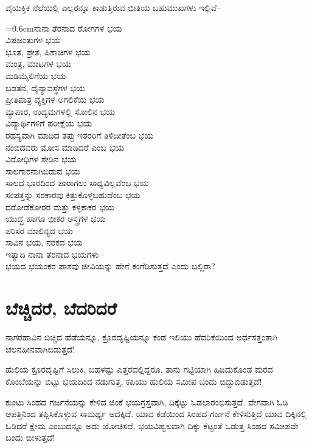 ವೈಯಕ್ತಿಕ ನೆಲೆಯಲ್ಲಿ ಎಲ್ಲರನ್ನೂ ಕಾಡುತ್ತಿರುವ ಭೀತಿಯ ಬಹುಮುಖಗಳು ಇಲ್ಲಿವೆ–

{\noindent\leftskip=0.6cmನಾನಾ ತೆರನಾದ ರೋಗಗಳ ಭಯ\\
 ವಿಷಜಂತುಗಳ ಭಯ\\
 ಭೂತ, ಪ್ರೇತ, ಪಿಶಾಚಿಗಳ ಭಯ\\
 ಮಂತ್ರ, ಮಾಟಗಳ ಭಯ\\
 ಮಡಿಮೈಲಿಗೆಯ ಭಯ\\
 ಬಡತನ, ದೈನ್ಯಾವಸ್ಥೆಗಳ ಭಯ\\
 ಪ್ರೀತಿಪಾತ್ರ ವ್ಯಕ್ತಿಗಳ ಅಗಲಿಕೆಯ ಭಯ\\
 ವ್ಯಾಪಾರ, ಉದ್ಯಮಗಳಲ್ಲಿ ಸೋಲಿನ ಭಯ\\
 ವಿದ್ಯಾರ್ಥಿಗಳಿಗೆ ಪರೀಕ್ಷೆಯ ಭಯ\\
 ರಹಸ್ಯವಾಗಿ ಮಾಡಿದ ತಪ್ಪು ಇತರರಿಗೆ ತಿಳಿದೀತೆಂಬ ಭಯ\\
 ನಂಬಿದವರು ಮೋಸ ಮಾಡಿದರೆ ಎಂಬ ಭಯ\\
 ವಿರೋಧಿಗಳ ಸೇಡಿನ ಭಯ\\
 ಸಾಲಗಾರನಾಗಿಬಿಡುವ ಭಯ\\
 ಸಾಲದ ಭಾರದಿಂದ ಪಾರಾಗಲು ಸಾಧ್ಯವಿಲ್ಲವೆಂಬ ಭಯ\\
 ಸಂಪತ್ತನ್ನು ಸರಕಾರವು ಕಿತ್ತುಕೊಳ್ಳಬಹುದೆಂಬ ಭಯ\\
 ದರೋಡೆಕೋರರ ಮತ್ತು ಕಳ್ಳಕಾಕರ ಭಯ\\
 ಯುದ್ಧ ಹಾಗೂ ಭೀಕರ ಅಸ್ತ್ರಗಳ ಭಯ\\
 ಪರಿಸರ ಮಾಲಿನ್ಯದ ಭಯ\\
 ಸಾವಿನ ಭಯ, ನರಕದ ಭಯ\\
 ಇತ್ಯಾದಿ ನಾನಾ ತೆರನಾದ ಭಯಗಳು\\
 ಭಯದ ಭಯಂಕರ ಪಾಶವು ಜೀವಿಯನ್ನು ಹೇಗೆ ಕಂಗೆಡಿಸುತ್ತದೆ ಎಂದು ಬಲ್ಲಿರಾ?\par}


\section*{ಬೆಚ್ಚಿದರೆ, ಬೆದರಿದರೆ}


ನಾಗರಹಾವಿನ ಬಿಚ್ಚಿದ ಹೆಡೆಯನ್ನೂ, ಕ್ರೂರದೃಷ್ಟಿಯನ್ನೂ ಕಂಡ ಇಲಿಯು ಹೆದರಿಕೆಯಿಂದ ಅರ್ಧಸತ್ತಂತಾಗಿ ಚಲನಹೀನವಾಗಿಬಿಡುತ್ತದೆ!

ಹುಲಿಯ ಕ್ರೂರದೃಷ್ಟಿಗೆ ಸಿಲುಕಿ, ಬಹಳಷ್ಟು ಎತ್ತರದಲ್ಲಿದ್ದರೂ, ತಾನು ಗಟ್ಟಿಯಾಗಿ ಹಿಡಿದುಕೊಂಡ ಮರದ ಕೊಂಬೆಯನ್ನು ಬಿಟ್ಟು ಭಯದಿಂದ ನಡುಗುತ್ತ, ಕಪಿಯು ಹುಲಿಯ ಸಮೀಪ ಬಂದು ಬಿದ್ದುಬಿಡುತ್ತದೆ!

ಕುಂಟು ಸಿಂಹದ ಗರ್ಜನೆಯನ್ನು ಕೇಳಿದ ಜಿಂಕೆ ಭಯಗ್ರಸ್ತವಾಗಿ, ದಿಕ್ಕೆಟ್ಟು ಓಡಲಾರಂಭಿಸುತ್ತದೆ. ವೇಗವಾಗಿ ಓಡಿ ಆಪತ್ತಿನಿಂದ ತಪ್ಪಿಸಿಕೊಳ್ಳುವ ಸಾಮರ್ಥ್ಯ ಅದಕ್ಕಿದೆ. ಯಾವ ಕಡೆಯಿಂದ ಸಿಂಹದ ಗರ್ಜನೆ ಕೇಳಿಸುತ್ತಿದೆ ಯಾವ ದಿಕ್ಕಿನಲ್ಲಿ ಓಡಿದರೆ ಕ್ಷೇಮ ಎಂಬುದನ್ನೂ ಅದು ಯೋಚಿಸದೆ, ಭಯವಿಹ್ವಲವಾಗಿ ದಿಕ್ಕು ಕೆಟ್ಟಂತೆ ಓಡುತ್ತ ಸಿಂಹದ ಸಮೀಪವೇ ಬಂದು ಬೀಳುತ್ತದೆ!

